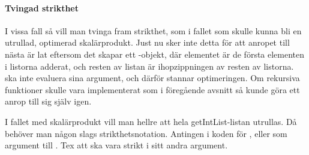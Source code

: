 \documentclass[Rapport]{subfiles}
\begin{document}
\paragraph{Tvingad strikthet}
I vissa fall så vill man tvinga fram strikthet, som i fallet 
 som skulle kunna bli en utrullad,
optimerad skalärprodukt. Just nu sker inte detta för att anropet till nästa
 är lat eftersom det skapar ett -objekt, där elementet är de första
elementen i listorna adderat, och resten av listan är ihopzippningen av resten
av listorna.  ska inte evaluera sina argument, och därför stannar
optimeringen. Om rekursiva funktioner skulle vara implementerat som i föregående
avsnitt så kunde göra ett anrop till sig själv igen.

    I fallet med skalärprodukt vill man hellre att hela getIntList-listan 
utrullas. Då behöver man någon slags strikthetsnotation. Antingen i koden 
för , eller som argument till . Tex att  ska vara strikt i 
sitt andra argument.
\end{document}
